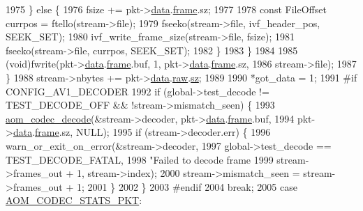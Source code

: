 \begin{DoxyCodeInclude}
{{{{{{{{{{{{{{{{{{{{{{{{{{{{{{{{{{{{{{1975             \} \textcolor{keywordflow}{else} \{
1976               fsize += pkt->\hyperlink{structaom__codec__cx__pkt_afb379cd4bfa7692d1d6e85f4e4b2b410}{data}.\hyperlink{structaom__codec__cx__pkt_a4180a6ae59b0d295bc915d4689df4cb0}{frame}.sz;
1977 
1978               \textcolor{keyword}{const} FileOffset currpos = ftello(stream->file);
1979               fseeko(stream->file, ivf\_header\_pos, SEEK\_SET);
1980               ivf\_write\_frame\_size(stream->file, fsize);
1981               fseeko(stream->file, currpos, SEEK\_SET);
1982             \}
1983           \}
1984 
1985           (void)fwrite(pkt->\hyperlink{structaom__codec__cx__pkt_afb379cd4bfa7692d1d6e85f4e4b2b410}{data}.\hyperlink{structaom__codec__cx__pkt_a4180a6ae59b0d295bc915d4689df4cb0}{frame}.buf, 1, pkt->\hyperlink{structaom__codec__cx__pkt_afb379cd4bfa7692d1d6e85f4e4b2b410}{data}.\hyperlink{structaom__codec__cx__pkt_a4180a6ae59b0d295bc915d4689df4cb0}{frame}.sz,
1986                        stream->file);
1987         \}
1988         stream->nbytes += pkt->\hyperlink{structaom__codec__cx__pkt_afb379cd4bfa7692d1d6e85f4e4b2b410}{data}.\hyperlink{structaom__codec__cx__pkt_a4fc6ea5e240c5df0acbf77aa2fe5ec6f}{raw}.\hyperlink{structaom__fixed__buf_a02f47e8b960c332c60a8aa4b7e37426f}{sz};
1989 
1990         *got\_data = 1;
1991 \textcolor{preprocessor}{#if CONFIG\_AV1\_DECODER}
1992         \textcolor{keywordflow}{if} (global->test\_decode != TEST\_DECODE\_OFF && !stream->mismatch\_seen) \{
1993           \hyperlink{group__decoder_gab03fdb999d1f83a5896869a3ba5f68f7}{aom\_codec\_decode}(&stream->decoder, pkt->\hyperlink{structaom__codec__cx__pkt_afb379cd4bfa7692d1d6e85f4e4b2b410}{data}.\hyperlink{structaom__codec__cx__pkt_a4180a6ae59b0d295bc915d4689df4cb0}{frame}.buf,
1994                            pkt->\hyperlink{structaom__codec__cx__pkt_afb379cd4bfa7692d1d6e85f4e4b2b410}{data}.\hyperlink{structaom__codec__cx__pkt_a4180a6ae59b0d295bc915d4689df4cb0}{frame}.sz, NULL);
1995           \textcolor{keywordflow}{if} (stream->decoder.err) \{
1996             warn\_or\_exit\_on\_error(&stream->decoder,
1997                                   global->test\_decode == TEST\_DECODE\_FATAL,
1998                                   \textcolor{stringliteral}{"Failed to decode frame %
1999                                   stream->frames\_out + 1, stream->index);
2000             stream->mismatch\_seen = stream->frames\_out + 1;
2001           \}
2002         \}
2003 \textcolor{preprocessor}{#endif}
2004         \textcolor{keywordflow}{break};
2005       \textcolor{keywordflow}{case} \hyperlink{group__encoder_ggafeb69da4a9649a54e805f59c26d8dfeda7dcdcb6c401cac64ca98b51f52de8d4b}{AOM\_CODEC\_STATS\_PKT}:
}}}}}}}}}}}}}}}}}}}}}}}}}}}}}}}}}}}}}}}
\end{DoxyCodeInclude}

